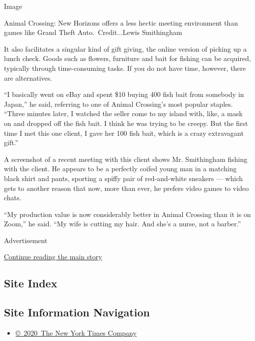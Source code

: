 Image

Animal Crossing: New Horizons offers a less hectic meeting environment
than games like Grand Theft Auto.~Credit...Lewis Smithingham

It also facilitates a singular kind of gift giving, the online version
of picking up a lunch check. Goods such as flowers, furniture and bait
for fishing can be acquired, typically through time-consuming tasks. If
you do not have time, however, there are alternatives.

``I basically went on eBay and spent \$10 buying 400 fish bait from
somebody in Japan,'' he said, referring to one of Animal Crossing's most
popular staples. ``Three minutes later, I watched the seller come to my
island with, like, a mask on and dropped off the fish bait. I think he
was trying to be creepy. But the first time I met this one client, I
gave her 100 fish bait, which is a crazy extravagant gift.''

A screenshot of a recent meeting with this client shows Mr. Smithingham
fishing with the client. He appears to be a perfectly coifed young man
in a matching black shirt and pants, sporting a spiffy pair of
red-and-white sneakers --- which gets to another reason that now, more
than ever, he prefers video games to video chats.

``My production value is now considerably better in Animal Crossing than
it is on Zoom,'' he said. ``My wife is cutting my hair. And she's a
nurse, not a barber.''

Advertisement

\protect\hyperlink{after-bottom}{Continue reading the main story}

\hypertarget{site-index}{%
\subsection{Site Index}\label{site-index}}

\hypertarget{site-information-navigation}{%
\subsection{Site Information
Navigation}\label{site-information-navigation}}

\begin{itemize}
\tightlist
\item
  \href{https://help.nytimes3xbfgragh.onion/hc/en-us/articles/115014792127-Copyright-notice}{©~2020~The
  New York Times Company}
\end{itemize}

